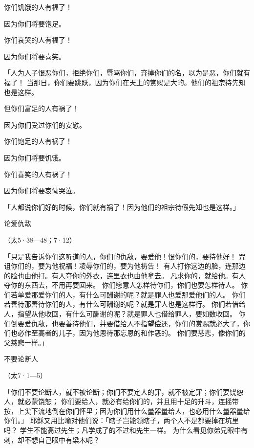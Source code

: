 {\par }{\Q {}你们饥饿的人有福了！
\par }{\Q 因为你们将要饱足。
\par }{\Q 你们哀哭的人有福了！
\par }{\Q 因为你们将要喜笑。
\par }{\PP {}「人为人子恨恶你们，拒绝你们，辱骂你们，弃掉你们的名，以为是恶，你们就有福了！
当那日，你们要{}跳跃，因为你们在天上的赏赐是大的。他们的祖宗待先知也是这样。
\par }{\Q {}但你们富足的人有祸了！
\par }{\Q 因为你们受过你们的安慰。
\par }{\Q {}你们饱足的人有祸了！
\par }{\Q 因为你们将要饥饿。
\par }{\Q 你们喜笑的人有祸了！
\par }{\Q 因为你们将要哀恸哭泣。
\par }{\PP {}「人都说你们好的时候，你们就有祸了！因为他们的祖宗待假先知也是这样。」
\par }{\SH 论爱仇敌
\par }{\R （太5·38—48；7·12）
\par }{\PP {}「只是我告诉你们这听道的人，你们的仇敌，要爱他！恨你们的，要待他好！
咒诅你们的，要为他祝福！凌辱你们的，要为他祷告！
有人打你这边的脸，连那边的脸也由他打。有人夺你的外衣，连里衣也由他拿去。
凡求你的，就给他。有人夺你的东西去，不用再要回来。
你们愿意人怎样待你们，你们也要怎样待人。
你们若单爱那爱你们的人，有什么可酬谢的呢？就是罪人也爱那爱他们的人。
你们若善待那善待你们的人，有什么可酬谢的呢？就是罪人也是这样行。
你们若借给人，指望从他收回，有什么可酬谢的呢？就是罪人也借给罪人，要如数收回。
你们倒要爱仇敌，也要善待他们，并要借给人不指望偿还，你们的赏赐就必大了，你们也必作至高者的儿子，因为他恩待那忘恩的和作恶的。
你们要慈悲，像你们的父慈悲一样。」
\par }{\SH 不要论断人
\par }{\R （太7·1—5）
\par }{\PP {}「你们不要论断人，就不被论断；你们不要定人的罪，就不被定罪；你们要饶恕人，就必蒙饶恕；
你们要给人，就必有给你们的，并且用十足的升斗，连摇带按，上尖下流地倒在你们怀里；因为你们用什么量器量给人，也必用什么量器量给你们。」
耶稣又用比喻对他们说：「瞎子岂能领瞎子，两个人不是都要掉在坑里吗？
学生不能高过先生；凡学成了的不过和先生一样。
为什么看见你弟兄眼中有刺，却不想自己眼中有梁木呢？
}
